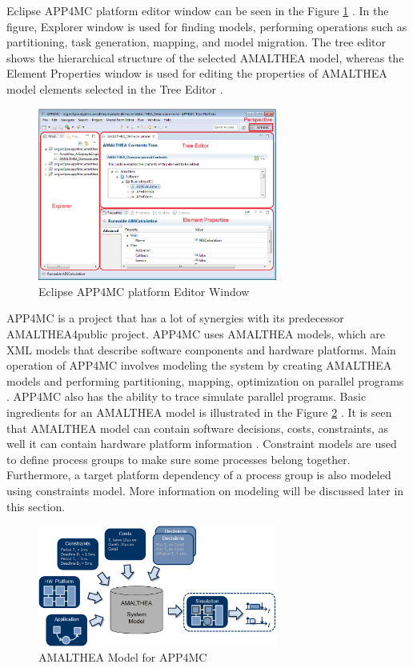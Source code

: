 Eclipse APP4MC platform editor window can be seen in the Figure \ref{fig:app4mcenv} \cite{app4mchelp}. In the figure, Explorer window is used for finding models, performing operations such as partitioning, task generation, mapping, and model migration. The tree editor shows the hierarchical structure of the selected AMALTHEA model, whereas the Element Properties window is used for editing the properties of AMALTHEA model elements selected in the Tree Editor \cite{app4mchelp}.

\begin{figure}[!ht]
	\centering
	\includegraphics[width=0.7\textwidth]{content/images/app4mcenv.png}
	\caption{Eclipse APP4MC platform Editor Window \cite{app4mchelp}}
	\label{fig:app4mcenv}
\end{figure}


APP4MC is a project that has a lot of synergies with its predecessor AMALTHEA4public \cite{amalthea4publicweb} project. APP4MC uses AMALTHEA models, which are XML models that describe software components and hardware platforms. Main operation of APP4MC involves modeling the system by creating AMALTHEA models and performing partitioning, mapping, optimization on parallel programs \cite{ICPDSSE}. APP4MC also has the ability to trace simulate parallel programs. Basic ingredients for an AMALTHEA model is illustrated in the Figure \ref{fig:app4mcmodel} \cite{app4mcweb}. It is seen that AMALTHEA model can contain software decisions, costs, constraints, as well it can contain hardware platform information \cite{app4mcweb}. Constraint models are used to define process groups to make sure some processes belong together. Furthermore, a target platform dependency of a process group is also modeled using constraints model. More information on modeling will be discussed later in this section.

\begin{figure}[!ht]
	\centering
	\includegraphics[width=0.7\textwidth]{content/images/app4mcmodel.png}
	\caption{AMALTHEA Model for APP4MC \cite{app4mcweb}}
	\label{fig:app4mcmodel}
\end{figure}

